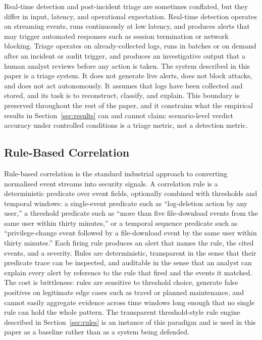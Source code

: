 \documentclass[conference]{IEEEtran}
\begin{document}
Real-time detection and post-incident triage are sometimes conflated, but they differ in input, latency, and operational expectation. Real-time detection operates on streaming events, runs continuously at low latency, and produces alerts that may trigger automated responses such as session termination or network blocking. Triage operates on already-collected logs, runs in batches or on demand after an incident or audit trigger, and produces an investigative output that a human analyst reviews before any action is taken. The system described in this paper is a triage system. It does not generate live alerts, does not block attacks, and does not act autonomously. It assumes that logs have been collected and stored, and its task is to reconstruct, classify, and explain. This boundary is preserved throughout the rest of the paper, and it constrains what the empirical results in Section~\ref{sec:results} can and cannot claim: scenario-level verdict accuracy under controlled conditions is a triage metric, not a detection metric.

\subsection{Rule-Based Correlation}
\label{sec:bg-rules}

Rule-based correlation is the standard industrial approach to converting normalised event streams into security signals. A correlation rule is a deterministic predicate over event fields, optionally combined with thresholds and temporal windows: a single-event predicate such as ``log-deletion action by any user,'' a threshold predicate such as ``more than five file-download events from the same user within thirty minutes,'' or a temporal sequence predicate such as ``privilege-change event followed by a file-download event by the same user within thirty minutes.'' Each firing rule produces an alert that names the rule, the cited events, and a severity. Rules are deterministic, transparent in the sense that their predicate trace can be inspected, and auditable in the sense that an analyst can explain every alert by reference to the rule that fired and the events it matched. The cost is brittleness: rules are sensitive to threshold choice, generate false positives on legitimate edge cases such as travel or planned maintenance, and cannot easily aggregate evidence across time windows long enough that no single rule can hold the whole pattern. The transparent threshold-style rule engine described in Section~\ref{sec:rules} is an instance of this paradigm and is used in this paper as a baseline rather than as a system being defended.
\end{document}
